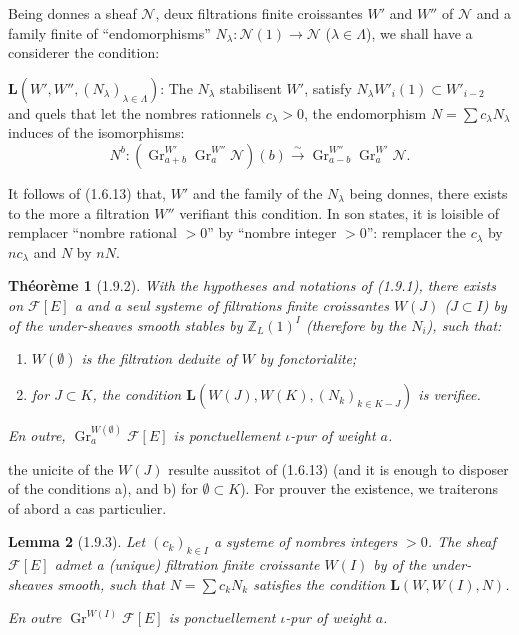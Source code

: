 \documentclass[12pt,a4paper]{article}
\theoremstyle{plain}
\newtheorem{theorem}{Th\'eor\`eme}[section]
\newtheorem{lemma}[theorem]{Lemma}
\theoremstyle{definition}
\theoremstyle{remark}
\DeclareMathOperator{\Gr}{Gr}
\newcommand{\ZZ}{{\mathbb{Z}}}
\begin{document}
Being donnes a sheaf $\mathscr{N}$, deux filtrations finite croissantes $W'$ and $W''$ of $\mathscr{N}$ and a family finite of ``endomorphisms'' $N_\lambda : \mathscr{N}(1) \to \mathscr{N}$ ($\lambda \in \Lambda$), we shall have a considerer the condition:

$\mathbf{L}(W', W'', (N_\lambda)_{\lambda \in \Lambda})$: The $N_\lambda$ stabilisent $W'$, satisfy $N_\lambda W'_i(1) \subset W'_{i-2}$ and quels that let the nombres rationnels $c_\lambda > 0$, the endomorphism $N = \sum c_\lambda N_\lambda$ induces of the isomorphisms:
\[ N^b : (\Gr_{a+b}^{W'} \Gr_a^{W''} \mathscr{N})(b) \xrightarrow{\sim} \Gr_{a-b}^{W''} \Gr_a^{W'} \mathscr{N}. \]

It follows of (1.6.13) that, $W'$ and the family of the $N_\lambda$ being donnes, there exists to the more a filtration $W''$ verifiant this condition. In son states, it is loisible of remplacer ``nombre rational $> 0$'' by ``nombre integer $> 0$'': remplacer the $c_\lambda$ by $nc_\lambda$ and $N$ by $nN$.


\begin{theorem}[1.9.2]
With the hypotheses and notations of (1.9.1), there exists on $\mathscr{F}[E]$ a and a seul systeme of filtrations finite croissantes $W(J)$ ($J \subset I$) by of the under-sheaves smooth stables by $\ZZ_L(1)^I$ (therefore by the $N_i$), such that:
\begin{enumerate}[label=\alph*)]
\item $W(\emptyset)$ is the filtration deduite of $W$ by fonctorialite;
\item for $J \subset K$, the condition $\mathbf{L}(W(J), W(K), (N_k)_{k \in K-J})$ is verifiee.
\end{enumerate}
En outre, $\Gr_a^{W(\emptyset)} \mathscr{F}[E]$ is ponctuellement $\iota$-pur of weight $a$.
\end{theorem}

the unicite of the $W(J)$ resulte aussitot of (1.6.13) (and it is enough to disposer of the conditions a), and b) for $\emptyset \subset K$). For prouver the existence, we traiterons of abord a cas particulier.

\begin{lemma}[1.9.3]
Let $(c_k)_{k \in I}$ a systeme of nombres integers $> 0$. The sheaf $\mathscr{F}[E]$ admet a (unique) filtration finite croissante $W(I)$ by of the under-sheaves smooth, such that $N = \sum c_k N_k$ satisfies the condition $\mathbf{L}(W, W(I), N)$.

En outre $\Gr^{W(I)} \mathscr{F}[E]$ is ponctuellement $\iota$-pur of weight $a$.
\end{lemma}
\end{document}
